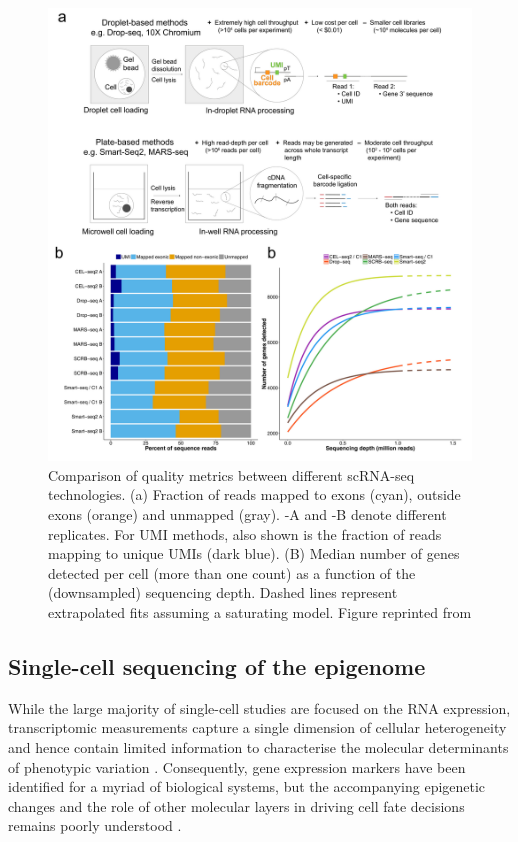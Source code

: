 \begin{figure}[H]
	\centering
	\includegraphics[width=0.95\linewidth]{scRNA_seq_comparison}
	\caption[]{Comparison of quality metrics between different scRNA-seq technologies. (a) Fraction of reads mapped to exons (cyan), outside exons (orange) and unmapped (gray). -A and -B denote different replicates. For UMI methods, also shown is the fraction of reads mapping to unique UMIs (dark blue). (B) Median number of genes detected per cell (more than one count) as a function of the (downsampled) sequencing depth. Dashed lines represent extrapolated fits assuming a saturating model. Figure reprinted from \cite{Ziegenhain2017} }
	\label{fig:scRNA_seq_comparison}
\end{figure}


\subsection{Single-cell sequencing of the epigenome}

While the large majority of single-cell studies are focused on the RNA expression, transcriptomic measurements capture a single dimension of cellular heterogeneity and hence contain limited information to characterise the molecular determinants of phenotypic variation \cite{Ritchie2015}. Consequently, gene expression markers have been identified for a myriad of biological systems, but the accompanying epigenetic changes and the role of other molecular layers in driving cell fate decisions remains poorly understood \cite{Griffiths2018,Kelsey2017,Bheda2014}.

